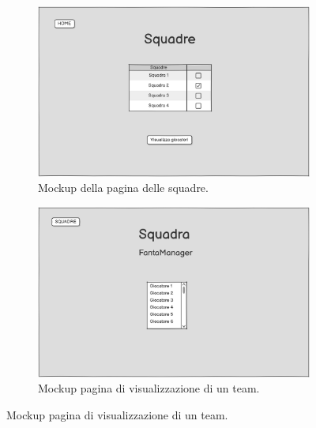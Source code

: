 \begin{figure}[H]
    \centering

    \begin{subfigure}[b]{0.49\textwidth}
        \centering
        \includegraphics[width=\textwidth]{Resources/Mockups/Squadre.png}
        \caption{Mockup della pagina delle squadre.}
        \label{fig:pagina_squadre}
    \end{subfigure}
    \hfill
    \begin{subfigure}[b]{0.49\textwidth}
        \centering
        \includegraphics[width=\textwidth]{Resources/Mockups/VisualizzaSquadra.png}
        \caption{Mockup pagina di visualizzazione di un team.}
        \label{fig:pagina_visualizza_squadra}
    \end{subfigure}


\end{figure}
